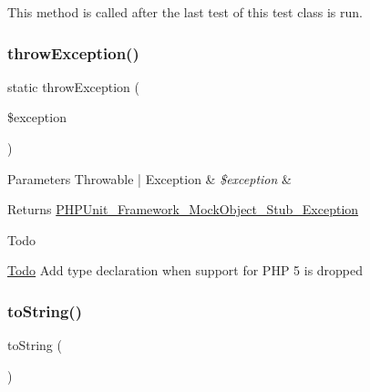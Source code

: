 This method is called after the last test of this test class is run. \mbox{\label{class_p_h_p_unit___framework___test_case_ad188456c04a828ed6701551da5f8c4e9}} 
\subsubsection{\texorpdfstring{throw\+Exception()}{throwException()}}
{\footnotesize\ttfamily static throw\+Exception (\begin{DoxyParamCaption}\item[{}]{\$exception }\end{DoxyParamCaption})\hspace{0.3cm}{\ttfamily [static]}}


\begin{DoxyParams}[1]{Parameters}
Throwable | Exception & {\em \$exception} & \\
\hline
\end{DoxyParams}
\begin{DoxyReturn}{Returns}
\mbox{\hyperlink{class_p_h_p_unit___framework___mock_object___stub___exception}{P\+H\+P\+Unit\+\_\+\+Framework\+\_\+\+Mock\+Object\+\_\+\+Stub\+\_\+\+Exception}}
\end{DoxyReturn}
\begin{DoxyRefDesc}{Todo}
\item[\mbox{\hyperlink{todo__todo000015}{Todo}}]Add type declaration when support for P\+HP 5 is dropped \end{DoxyRefDesc}
\mbox{\label{class_p_h_p_unit___framework___test_case_a5558c5d549f41597377fa1ea8a1cefa3}} 
\subsubsection{\texorpdfstring{to\+String()}{toString()}}
{\footnotesize\ttfamily to\+String (\begin{DoxyParamCaption}{ }\end{DoxyParamCaption})}

